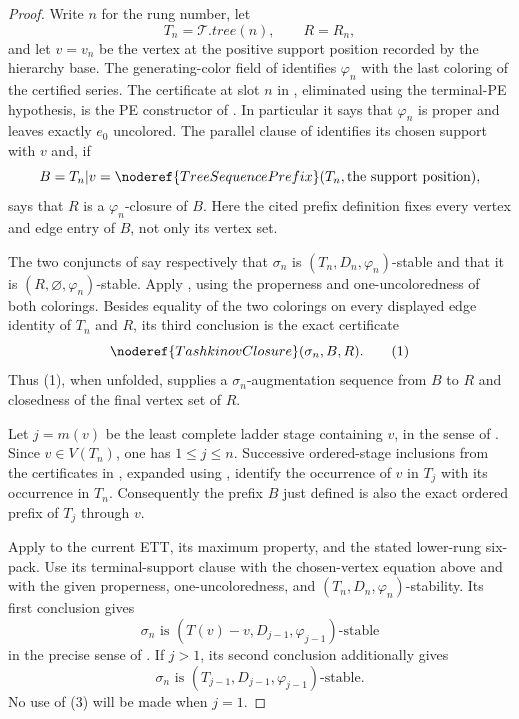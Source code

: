 \begin{proof}
Write $n$ for the rung number, let
\[
 T_n=\mathcal T.\mathit{tree}(n),\qquad R=R_n,
\]
and let $v=v_n$ be the vertex at the positive support position recorded
by the hierarchy base.  The generating-color field of
 identifies $\varphi_n$ with the last
coloring of the certified series.  The certificate at slot $n$ in
, eliminated using the terminal-PE hypothesis,
is the PE constructor of .  In particular it
says that $\varphi_n$ is proper and leaves exactly $e_0$ uncolored.  The
parallel clause of  identifies its chosen support
with $v$ and, if
\[
 B=T_n|v
   =\noderef{TreeSequencePrefix}(T_n,\text{the support position}),
\]
says that $R$ is a $\varphi_n$-closure of $B$.  Here the cited prefix
definition fixes every vertex and edge entry of $B$, not only its vertex
set.

The two conjuncts of  say respectively
that $\sigma_n$ is $(T_n,D_n,\varphi_n)$-stable and that it is
$(R,\varnothing,\varphi_n)$-stable.  Apply
, using the properness and
one-uncoloredness of both colorings.  Besides equality of the two
colorings on every displayed edge identity of $T_n$ and $R$, its third
conclusion is the exact certificate
\[
             \noderef{TashkinovClosure}(\sigma_n,B,R).       \tag{1}
\]
Thus (1), when unfolded, supplies a $\sigma_n$-augmentation sequence
from $B$ to $R$ and closedness of the final vertex set of $R$.

Let $j=m(v)$ be the least complete ladder stage containing $v$, in the
sense of .  Since $v\in V(T_n)$, one
has $1\leq j\leq n$.  Successive ordered-stage inclusions from the
certificates in , expanded using
, identify the occurrence of $v$ in
$T_j$ with its occurrence in $T_n$.  Consequently the prefix $B$ just
defined is also the exact ordered prefix of $T_j$ through $v$.

Apply  to the current ETT, its maximum property,
and the stated lower-rung six-pack.  Use its terminal-support clause with
the chosen-vertex equation above and with the given properness,
one-uncoloredness, and $(T_n,D_n,\varphi_n)$-stability.  Its first
conclusion gives
\[
 \sigma_n\text{ is }(T(v)-v,D_{j-1},\varphi_{j-1})
 \text{-stable}                                             \tag{2}
\]
in the precise sense of .  If
$j>1$, its second conclusion additionally gives
\[
 \sigma_n\text{ is }(T_{j-1},D_{j-1},\varphi_{j-1})
 \text{-stable}.                                            \tag{3}
\]
No use of (3) will be made when $j=1$.


\end{proof}
